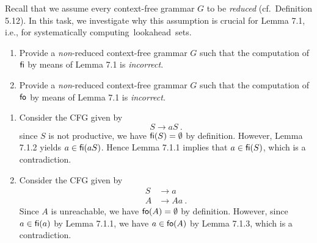 \begin{exercise}{20}
Recall that we assume every context-free grammar $G$ to be \emph{reduced} (cf.\ Definition 5.12). In this task, we investigate why this assumption is crucial for Lemma 7.1, i.e., for systematically \mbox{computing lookahead sets.}
%
\begin{enumerate}
	\item Provide a \emph{non}-reduced context-free grammar $G$ such that the computation of $\textsf{fi}$ by means of Lemma 7.1 is \emph{incorrect}.
	\item Provide a \emph{non}-reduced context-free grammar $G$ such that the computation of $\textsf{fo}$ by means of Lemma 7.1 is \emph{incorrect}.
\end{enumerate}
\end{exercise}

\begin{solution}

\begin{enumerate}
	\item Consider the CFG given by
	\[
	    S \rightarrow a S~.
	\]
	since $S$ is not productive, we have $\textsf{fi}(S) = \emptyset$ by definition. However, Lemma 7.1.2 yields $a \in \textsf{fi}(aS)$. Hence Lemma 7.1.1 implies that $a \in \textsf{fi}(S)$, which is a contradiction.
	\item Consider the CFG given by
	\begin{align*}
	  S &\rightarrow a \\
	  A & \rightarrow Aa~.
	\end{align*}
    Since $A$ is unreachable, we have $\textsf{fo}(A) = \emptyset$ by definition. However, since $a \in \textsf{fi}(a)$ by Lemma 7.1.1, we have $a \in \textsf{fo}(A)$ by Lemma 7.1.3, which is a contradiction.
\end{enumerate}

\end{solution}
